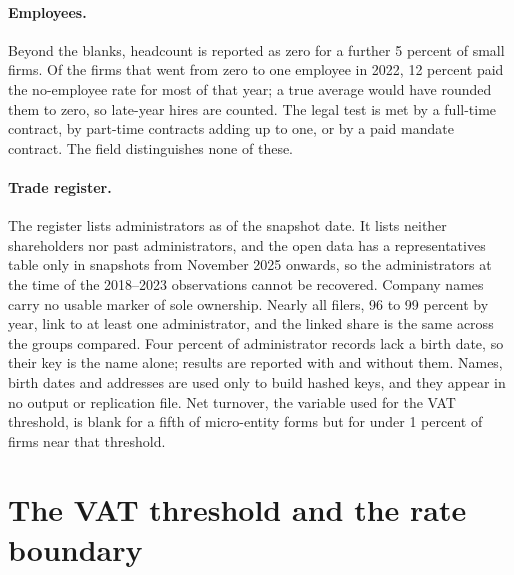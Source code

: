 \documentclass[12pt]{article}
\begin{document}
\paragraph{Employees.} Beyond the blanks, headcount is reported as zero for a further 5 percent of small firms. Of the firms that went from zero to one employee in 2022, 12 percent paid the no-employee rate for most of that year; a true average would have rounded them to zero, so late-year hires are counted. The legal test is met by a full-time contract, by part-time contracts adding up to one, or by a paid mandate contract. The field distinguishes none of these.

\paragraph{Trade register.} The register lists administrators as of the snapshot date. It lists neither shareholders nor past administrators, and the open data has a representatives table only in snapshots from November 2025 onwards, so the administrators at the time of the 2018--2023 observations cannot be recovered. Company names carry no usable marker of sole ownership. Nearly all filers, 96 to 99 percent by year, link to at least one administrator, and the linked share is the same across the groups compared. Four percent of administrator records lack a birth date, so their key is the name alone; results are reported with and without them. Names, birth dates and addresses are used only to build hashed keys, and they appear in no output or replication file. Net turnover, the variable used for the VAT threshold, is blank for a fifth of micro-entity forms but for under 1 percent of firms near that threshold.

\FloatBarrier
\section{The VAT threshold and the rate boundary}\label{app:vat}
\end{document}
